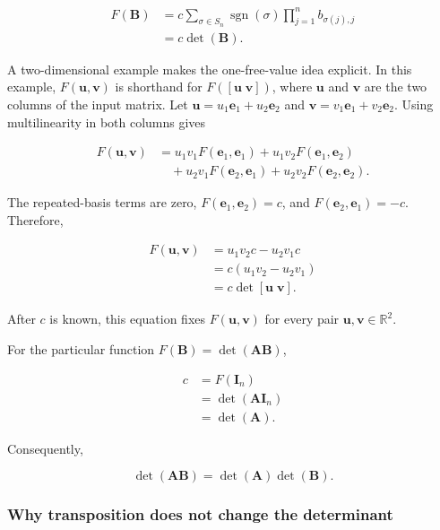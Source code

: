 \documentclass[
  australian,
  12pt,
  letterpaper,
  DIV=11,
  numbers=noendperiod,
  twoside]{scrreprt}
\begin{document}
\[
\begin{aligned}
F(\mathbf B)
&=c\sum_{\sigma\in S_n}
\operatorname{sgn}(\sigma)
\prod_{j=1}^{n}b_{\sigma(j),j}\\
&=c\det(\mathbf B).
\end{aligned}
\]

A two-dimensional example makes the one-free-value idea explicit. In
this example, \(F(\mathbf u,\mathbf v)\) is shorthand for
\(F([\mathbf u\;\mathbf v])\), where \(\mathbf u\) and \(\mathbf v\) are
the two columns of the input matrix. Let
\(\mathbf u=u_1\mathbf e_1+u_2\mathbf e_2\) and
\(\mathbf v=v_1\mathbf e_1+v_2\mathbf e_2\). Using multilinearity in
both columns gives

\[
\begin{aligned}
F(\mathbf u,\mathbf v)
&=u_1v_1F(\mathbf e_1,\mathbf e_1)
+u_1v_2F(\mathbf e_1,\mathbf e_2)\\
&\quad+u_2v_1F(\mathbf e_2,\mathbf e_1)
+u_2v_2F(\mathbf e_2,\mathbf e_2).
\end{aligned}
\]

The repeated-basis terms are zero, \(F(\mathbf e_1,\mathbf e_2)=c\), and
\(F(\mathbf e_2,\mathbf e_1)=-c\). Therefore,

\[
\begin{aligned}
F(\mathbf u,\mathbf v)
&=u_1v_2c-u_2v_1c\\
&=c(u_1v_2-u_2v_1)\\
&=c\det[\mathbf u\;\mathbf v].
\end{aligned}
\]

After \(c\) is known, this equation fixes \(F(\mathbf u,\mathbf v)\) for
every pair \(\mathbf u,\mathbf v\in\mathbb R^2\).

For the particular function \(F(\mathbf B)=\det(\mathbf A\mathbf B)\),

\[
\begin{aligned}
c
&=F(\mathbf I_n)\\
&=\det(\mathbf A\mathbf I_n)\\
&=\det(\mathbf A).
\end{aligned}
\]

Consequently,

\[
\boxed{
\det(\mathbf A\mathbf B)
=
\det(\mathbf A)\det(\mathbf B)
}.
\]

\subsubsection{Why transposition does not change the
determinant}\label{why-transposition-does-not-change-the-determinant}
\end{document}
